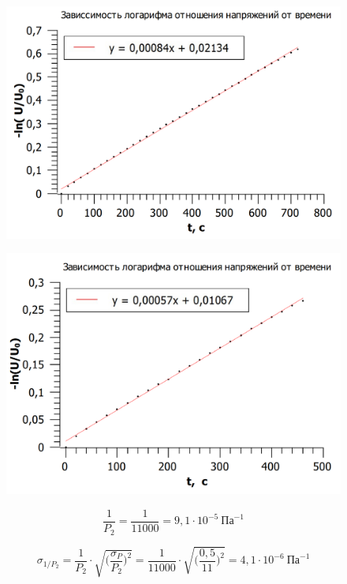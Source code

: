 \documentclass[11pt]{article}
\begin{document}
\begin{figure}[h!]
\centering
\includegraphics[scale=0.6]{3graph.png}
\label{fig:Image1}
\end{figure}

\begin{figure}[h!]
\centering
\includegraphics[scale=0.6]{4graph.png}
\label{fig:Image1}
\end{figure}

\vspace{0.3cm}

\[\frac{1}{P_2} = \frac{1}{11000} = 9,1 \cdot 10^{-5} \: \textit{Па}^{-1}\]

\[\sigma_{1/P_2} = \frac{1}{P_2} \cdot \sqrt{\Big( \frac{\sigma_P}{P_2} \Big)^2} = \frac{1}{11000} \cdot \sqrt{\Big( \frac{0,5}{11} \Big)^2} = 4,1 \cdot 10^{-6} \: \textit{Па}^{-1}\]
\end{document}
